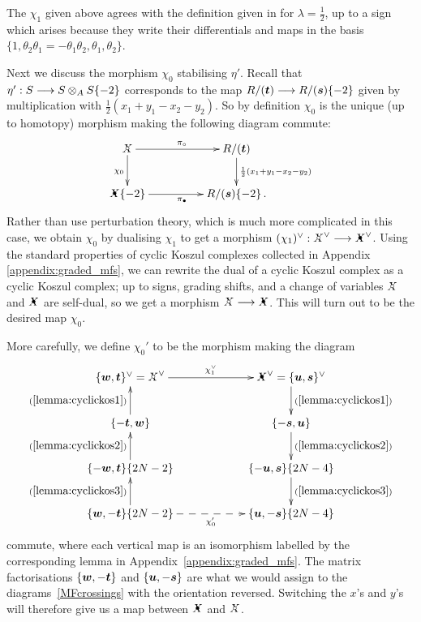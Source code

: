 \documentclass{compositio}
\theoremstyle{definition}
\numberwithin{equation}{section}
\begin{document}
The $\chi_1$ given above agrees with the definition given in \cite{kr0401268} for $\lambda = \frac{1}{2}$, up to a sign which arises because they write their differentials and maps in the basis $\{1, \theta_2 \theta_1 = - \theta_1 \theta_2, \theta_1, \theta_2\}$.

\medskip

Next we discuss the morphism $\chi_0$ stabilising $\eta'$. Recall that $\eta': S \longrightarrow S \otimes_A S\{-2\}$ corresponds to the map $R/(\boldsymbol{t}) \longrightarrow R/(\boldsymbol{s})\{-2\}$ given by multiplication with $\frac{1}{2}(x_1 + y_1 - x_2 - y_2)$. So by definition $\chi_0$ is the unique (up to homotopy) morphism making the following diagram commute:
\begin{equation}\label{eq:cons50}
\xymatrix@C+2pc{
\Xcirc \ar[d]_{\chi_0} \ar[r]^{\pi_{\circ}} & R/(\boldsymbol{t}) \ar[d]^-{\frac{1}{2}(x_1+y_1-x_2-y_2)}\\
\Xbul\{-2\} \ar[r]_{\pi_{\bullet}} & R/(\boldsymbol{s})\{-2\} \, .
}
\end{equation}
Rather than use perturbation theory, which is much more complicated in this case, we obtain $\chi_0$ by dualising $\chi_1$ to get a morphism $(\chi_1)\mdual: \Xcirc\mdual \lto \Xbul\mdual$. Using the standard properties of cyclic Koszul complexes collected in Appendix \ref{appendix:graded_mfs}, we can rewrite the dual of a cyclic Koszul complex as a cyclic Koszul complex; up to signs, grading shifts, and a change of variables $\Xcirc$ and $\Xbul$ are self-dual, so we get a morphism $\Xcirc \lto \Xbul$. This will turn out to be the desired map $\chi_0$.

More carefully, we define $\chi_0'$ to be the morphism making the diagram
\begin{equation}\label{eq:chi1dualischi0}
\xymatrix@C+3pc{
\{ \bs{w}, \bs{t} \}\mdual = \Xcirc\mdual \ar[r]^-{\chi_1\mdual} & \Xbul\mdual = \{ \bs{u}, \bs{s} \}\mdual \ar[d]^-{(\ref{lemma:cyclickos1})}\\
\{ -\bs{t}, \bs{w} \} \ar[u]^-{(\ref{lemma:cyclickos1})} & \{ -\bs{s}, \bs{u} \} \ar[d]^-{(\ref{lemma:cyclickos2})}\\
\{ -\bs{w}, \bs{t} \}\{ 2N - 2 \} \ar[u]^-{(\ref{lemma:cyclickos2})} & \{ -\bs{u}, \bs{s} \} \{ 2N - 4 \} \ar[d]^-{(\ref{lemma:cyclickos3})}\\
\{ \bs{w}, -\bs{t} \}\{ 2N - 2 \} \ar@{-->}[r]_-{\chi_0'} \ar[u]^-{(\ref{lemma:cyclickos3})} & \{ \bs{u}, -\bs{s} \}\{ 2N - 4 \}
}
\end{equation}
commute, where each vertical map is an isomorphism labelled by the corresponding lemma in Appendix~\ref{appendix:graded_mfs}. The matrix factorisations $\{ \boldsymbol{w}, -\boldsymbol{t} \}$ and $\{ \boldsymbol{u}, -\boldsymbol{s} \}$ are what we would assign to the diagrams~\eqref{MFcrossings} with the orientation reversed. Switching the $x$'s and $y$'s will therefore give us a map between $\Xbul$ and $\Xcirc$.
\end{document}
